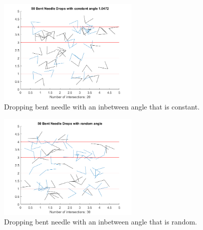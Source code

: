 \documentclass[11pt]{article}
\begin{document}
\begin{figure}[H]
\begin{centering}
\includegraphics[width=0.6\textwidth]{bent_constant.png}
\end{centering}
\caption{Dropping bent needle with an inbetween angle that is constant.}
\label{fig:d2}
\end{figure}

\begin{figure}[H]
\begin{centering}
\includegraphics[width=0.6\textwidth]{bent_random.png}
\end{centering}
\caption{Dropping bent needle with an inbetween angle that is random.}
\label{fig:d3}
\end{figure}
\end{document}
